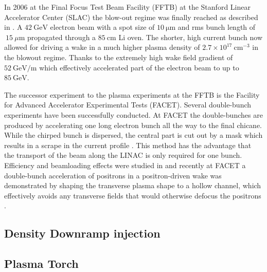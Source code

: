 In 2006 at the Final Focus Test Beam Facility (FFTB) at the Stanford Linear Accelerator Center (SLAC) the blow-out regime was finally reached as described in \cite{blumenfeld2007energyDoubling}.
A $42\ \mathrm{GeV}$ electron beam with a spot size of $10\ \mathrm{\mu m}$ and rms bunch length of $~15\ \mu\mathrm{m}$ propagated through a $85\ \mathrm{cm}$ Li oven. The shorter, high current bunch now allowed for driving a wake in a much higher plasma density of $2.7\times 10^{17}\ \mathrm{cm}^{-3} $ in the blowout regime. Thanks to the extremely high wake field gradient of $52\ \mathrm{GeV/m}$ which effectively accelerated part of the electron beam to up to $85\ \mathrm{GeV}$.

The successor experiment to the plasma experiments at the FFTB is the Facility for Advanced Accelerator Experimental Tests (FACET)\cite{clarke2012facet}. Several double-bunch experiments have been successfully conducted.  
At FACET the double-bunches are produced by accelerating one long electron bunch all the way to the final chicane. 
While the chirped bunch is dispersed, the central part is cut out by a mask which results in a scrape in the current profile  \cite{hogan2010FACET}. This method has the advantage that the transport of the beam along the LINAC is only required for one bunch.
Efficiency and beamloading effects were studied in \cite{litos2014high} and recently at FACET a double-bunch acceleration of positrons in a positron-driven wake was demonstrated by shaping the transverse plasma shape to a hollow channel, which effectively avoids any transverse fields that would otherwise defocus the positrons \cite{ThesisGessner}.
\subsection{Density Downramp injection}

\subsection{Plasma Torch}
\cite{PlaTo,PlaTo2}
